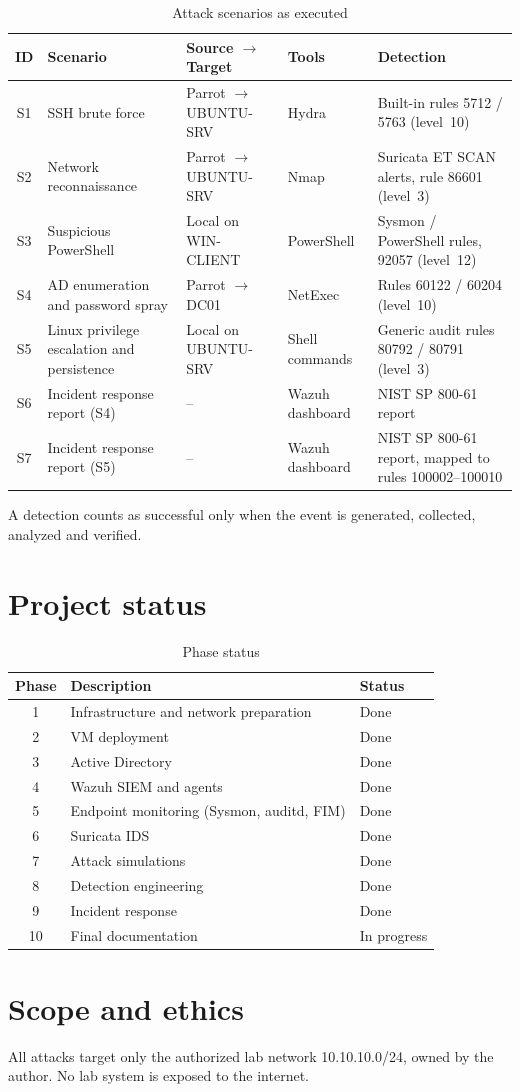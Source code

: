 \documentclass[11pt,a4paper]{article}
\begin{document}
\begin{table}[h]
\centering
\small
{}
\begin{tabularx}{\textwidth}{cLLLL}
\toprule
ID & Scenario & Source $\rightarrow$ Target & Tools & Detection \\
\midrule
S1 & SSH brute force & Parrot $\rightarrow$ UBUNTU-SRV & Hydra & Built-in rules 5712 / 5763 (level~10) \\
S2 & Network reconnaissance & Parrot $\rightarrow$ UBUNTU-SRV & Nmap & Suricata ET SCAN alerts, rule 86601 (level~3) \\
S3 & Suspicious PowerShell & Local on WIN-CLIENT & PowerShell & Sysmon / PowerShell rules, 92057 (level~12) \\
S4 & AD enumeration and password spray & Parrot $\rightarrow$ DC01 & NetExec & Rules 60122 / 60204 (level~10) \\
S5 & Linux privilege escalation and persistence & Local on UBUNTU-SRV & Shell commands & Generic audit rules 80792 / 80791 (level~3) \\
S6 & Incident response report (S4) & -- & Wazuh dashboard & NIST SP 800-61 report \\
S7 & Incident response report (S5) & -- & Wazuh dashboard & NIST SP 800-61 report, mapped to rules 100002--100010 \\
\bottomrule
\end{tabularx}
\caption{Attack scenarios as executed}
\end{table}

A detection counts as successful only when the event is generated, collected,
analyzed and verified.

\section{Project status}

\begin{table}[h]
\centering
\begin{tabularx}{\textwidth}{clX}
\toprule
Phase & Description & Status \\
\midrule
1 & Infrastructure and network preparation & Done \\
2 & VM deployment & Done \\
3 & Active Directory & Done \\
4 & Wazuh SIEM and agents & Done \\
5 & Endpoint monitoring (Sysmon, auditd, FIM) & Done \\
6 & Suricata IDS & Done \\
7 & Attack simulations & Done \\
8 & Detection engineering & Done \\
9 & Incident response & Done \\
10 & Final documentation & In progress \\
\bottomrule
\end{tabularx}
\caption{Phase status}
\end{table}

\section{Scope and ethics}

All attacks target only the authorized lab network 10.10.10.0/24, owned by the
author. No lab system is exposed to the internet.
\end{document}
